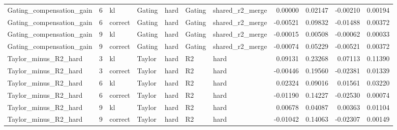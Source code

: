 \begin{tabular}{lrlllllrrrr}
Gating_compensation_gain & 6 & kl & Gating & hard & Gating & shared_r2_merge & 0.00000 & 0.02147 & -0.00210 & 0.00194 \\
Gating_compensation_gain & 6 & correct & Gating & hard & Gating & shared_r2_merge & -0.00521 & 0.09832 & -0.01488 & 0.00372 \\
Gating_compensation_gain & 9 & kl & Gating & hard & Gating & shared_r2_merge & -0.00015 & 0.00508 & -0.00062 & 0.00033 \\
Gating_compensation_gain & 9 & correct & Gating & hard & Gating & shared_r2_merge & -0.00074 & 0.05229 & -0.00521 & 0.00372 \\
Taylor_minus_R2_hard & 3 & kl & Taylor & hard & R2 & hard & 0.09131 & 0.23268 & 0.07113 & 0.11390 \\
Taylor_minus_R2_hard & 3 & correct & Taylor & hard & R2 & hard & -0.00446 & 0.19560 & -0.02381 & 0.01339 \\
Taylor_minus_R2_hard & 6 & kl & Taylor & hard & R2 & hard & 0.02324 & 0.09016 & 0.01561 & 0.03220 \\
Taylor_minus_R2_hard & 6 & correct & Taylor & hard & R2 & hard & -0.01190 & 0.14227 & -0.02530 & 0.00074 \\
Taylor_minus_R2_hard & 9 & kl & Taylor & hard & R2 & hard & 0.00678 & 0.04087 & 0.00363 & 0.01104 \\
Taylor_minus_R2_hard & 9 & correct & Taylor & hard & R2 & hard & -0.01042 & 0.14063 & -0.02307 & 0.00149 \\
\bottomrule
\end{tabular}
